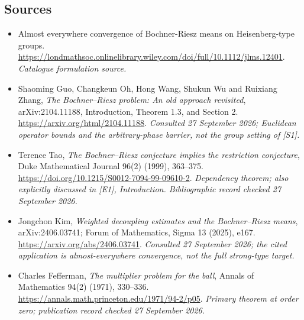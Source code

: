 \documentclass[11pt,a4paper]{article}
\numberwithin{equation}{section}
\begin{document}
\subsection{Sources}
\begin{itemize}\raggedright
\item[\textnormal{[S1]}]\hypertarget{source:statement:1}{} Almost everywhere convergence of Bochner-Riesz means on Heisenberg-type groups.
\url{https://londmathsoc.onlinelibrary.wiley.com/doi/full/10.1112/jlms.12401}.
{\small\textit{Catalogue formulation source.}}
\item[\textnormal{[E1]}]\hypertarget{extra:statement:1}{} Shaoming Guo, Changkeun
Oh, Hong Wang, Shukun Wu and Ruixiang Zhang, \emph{The Bochner--Riesz problem:
An old approach revisited}, arXiv:2104.11188, Introduction, Theorem 1.3,
and Section 2. \url{https://arxiv.org/html/2104.11188}.
{\small\textit{Consulted 27 September 2026; Euclidean operator bounds and
the arbitrary-phase barrier, not the group setting of [S1].}}
\item[\textnormal{[E2]}]\hypertarget{extra:statement:2}{} Terence Tao,
\emph{The Bochner--Riesz conjecture implies the restriction conjecture},
Duke Mathematical Journal 96(2) (1999), 363--375.
\url{https://doi.org/10.1215/S0012-7094-99-09610-2}.
{\small\textit{Dependency theorem; also explicitly discussed in [E1],
Introduction. Bibliographic record checked 27 September 2026.}}
\item[\textnormal{[E3]}]\hypertarget{extra:statement:3}{} Jongchon Kim,
\emph{Weighted decoupling estimates and the Bochner--Riesz means},
arXiv:2406.03741; Forum of Mathematics, Sigma 13 (2025), e167.
\url{https://arxiv.org/abs/2406.03741}.
{\small\textit{Consulted 27 September 2026; the cited application is
almost-everywhere convergence, not the full strong-type target.}}
\item[\textnormal{[E4]}]\hypertarget{extra:statement:4}{} Charles Fefferman,
\emph{The multiplier problem for the ball}, Annals of Mathematics 94(2)
(1971), 330--336. \url{https://annals.math.princeton.edu/1971/94-2/p05}.
{\small\textit{Primary theorem at order zero; publication record checked
27 September 2026.}}
\end{itemize}
\end{document}
